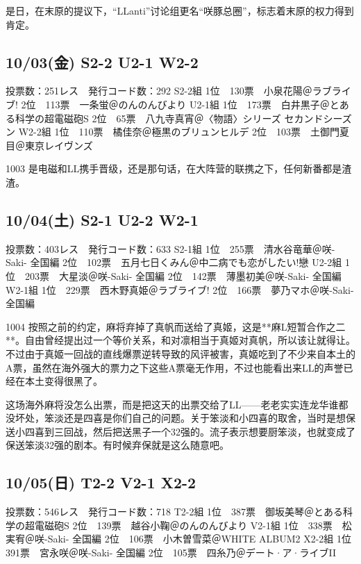 是日，在末原的提议下，“LLanti”讨论组更名“咲豚总圈”，标志着末原的权力得到肯定。

\subsection{10/03(金) S2-2 U2-1 W2-2}

    投票数：251レス　発行コード数：292
    S2-2組
    1位　130票　小泉花陽＠ラブライブ!
    2位　113票　一条蛍＠のんのんびより
    U2-1組
    1位　173票　白井黒子＠とある科学の超電磁砲S
    2位　65票　八九寺真宵＠〈物語〉シリーズ セカンドシーズン
    W2-2組
    1位　110票　橘佳奈＠極黒のブリュンヒルデ
    2位　103票　土御門夏目＠東京レイヴンズ

1003 是电磁和LL携手晋级，还是那句话，在大阵营的联携之下，任何新番都是渣渣。

\subsection{10/04(土) S2-1 U2-2 W2-1}

    投票数：403レス　発行コード数：633
    S2-1組
    1位　255票　清水谷竜華＠咲-Saki- 全国編
    2位　102票　五月七日くみん＠中二病でも恋がしたい!戀
    U2-2組
    1位　203票　大星淡＠咲-Saki- 全国編
    2位　142票　薄墨初美＠咲-Saki- 全国編
    W2-1組
    1位　229票　西木野真姫＠ラブライブ!
    2位　166票　夢乃マホ＠咲-Saki- 全国編

1004 按照之前的约定，麻将弃掉了真帆而送给了真姬，这是**麻L短暂合作之二**。自由曾经提出过一个等价关系，和对凛相当于真姬对真帆，所以该让就得让。不过由于真姬一回战的直线爆票逆转导致的风评被害，真姬吃到了不少来自本土的A票，虽然在海外强大的票力之下这些A票毫无作用，不过也能看出来LL的声誉已经在本土变得很黑了。

这场海外麻将没怎么出票，而是把这天的出票交给了LL——老老实实连龙华谁都没坏处，笨淡还是四喜是你们自己的问题。关于笨淡和小四喜的取舍，当时是想保送小四喜到三回战，然后把送黑子一个32强的。流子表示想要厨笨淡，也就变成了保送笨淡32强的剧本。有时候弃保就是这么随意吧。

\subsection{10/05(日) T2-2 V2-1 X2-2}

    投票数：546レス　発行コード数：718
    T2-2組
    1位　387票　御坂美琴＠とある科学の超電磁砲S
    2位　139票　越谷小鞠＠のんのんびより
    V2-1組
    1位　338票　松実宥＠咲-Saki- 全国編
    2位　106票　小木曽雪菜＠WHITE ALBUM2
    X2-2組
    1位　391票　宮永咲＠咲-Saki- 全国編
    2位　105票　四糸乃＠デート·ア·ライブII


